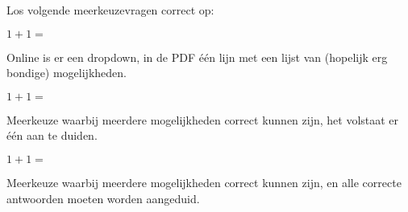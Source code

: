 \documentclass{ximera}
\begin{document}
\begin{exercise}
       Los volgende meerkeuzevragen correct op:
    \begin{question}
        $1+1 = $
        
        Online is er een dropdown, in de PDF één lijn met een lijst van (hopelijk erg bondige) mogelijkheden.
    \end{question}
    \begin{question}
        $1+1 = $\begin{multipleChoice} \end{multipleChoice}
        
        Meerkeuze waarbij meerdere mogelijkheden correct kunnen zijn, het volstaat er één aan te duiden.
        
    \end{question}
    \begin{question} 
        $1+1 = $\begin{selectAll} \end{selectAll}
    
        Meerkeuze waarbij meerdere mogelijkheden correct kunnen zijn, en alle correcte antwoorden moeten worden aangeduid.
    \end{question}
    
\end{exercise}
\end{document}
